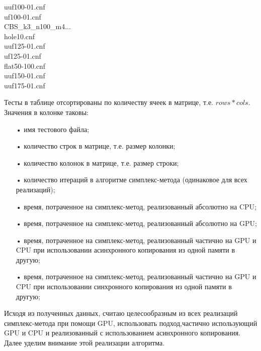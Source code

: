 \documentclass[a4paper,14pt,russian]{extreport}
\begin{document}
\begin{tabbing}
uuf100-01.cnf							 \\
uf100-01.cnf							 \\
CBS\_k3\_n100\_m4...							 \\
hole10.cnf							 \\
uuf125-01.cnf							 \\
uf125-01.cnf							 \\
flat50-100.cnf							 \\
uuf150-01.cnf							 \\
uuf175-01.cnf							
\end{tabbing}
\par
Тесты в таблице отсортированы по количеству ячеек в матрице, т.е. $rows * cols$. Значения в колонке таковы: 
\begin{itemize}
\item[•] имя тестового файла;
\item[•] количество строк в матрице, т.е. размер колонки;
\item[•] количество колонок в матрице, т.е. размер строки;
\item[•] количество итераций в алгоритме симплекс-метода (одинаковое для всех реализаций);
\item[•] время, потраченное на симплекс-метод, реализованный абсолютно на CPU;
\item[•] время, потраченное на симплекс-метод, реализованный абсолютно на GPU;
\item[•] время, потраченное на симплекс-метод, реализованный частично на GPU и CPU при использовании асинхронного копирования из одной памяти в другую;
\item[•] время, потраченное на симплекс-метод, реализованный частично на GPU и CPU при использовании синхронного копирования из одной памяти в другую;
\end{itemize}
\par
Исходя из полученных данных, считаю целесообразным из всех реализаций симплекс-метода при помощи GPU, использовать подход,частично использующий GPU и CPU и реализованный с использованием асинхронного копирования. Далее уделим внимание этой реализации алгоритма. 
\end{document}
